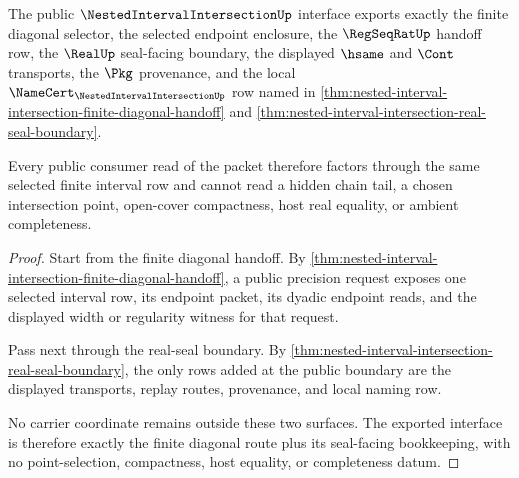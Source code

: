 \begin{theorem}
\label{thm:nested-interval-intersection-public-export}
The public $\NestedIntervalIntersectionUp$ interface exports exactly the finite diagonal selector, the selected endpoint enclosure, the $\RegSeqRatUp$ handoff row, the $\RealUp$ seal-facing boundary, the displayed $\hsame$ and $\Cont$ transports, the $\Pkg$ provenance, and the local $\NameCert_{\NestedIntervalIntersectionUp}$ row named in \autoref{thm:nested-interval-intersection-finite-diagonal-handoff} and \autoref{thm:nested-interval-intersection-real-seal-boundary}.

Every public consumer read of the packet therefore factors through the same selected finite interval row and cannot read a hidden chain tail, a chosen intersection point, open-cover compactness, host real equality, or ambient completeness.
\end{theorem}
\begin{proof}
Start from the finite diagonal handoff. By \autoref{thm:nested-interval-intersection-finite-diagonal-handoff}, a public precision request exposes one selected interval row, its endpoint packet, its dyadic endpoint reads, and the displayed width or regularity witness for that request.

Pass next through the real-seal boundary. By \autoref{thm:nested-interval-intersection-real-seal-boundary}, the only rows added at the public boundary are the displayed transports, replay routes, provenance, and local naming row.

No carrier coordinate remains outside these two surfaces. The exported interface is therefore exactly the finite diagonal route plus its seal-facing bookkeeping, with no point-selection, compactness, host equality, or completeness datum.
\end{proof}

